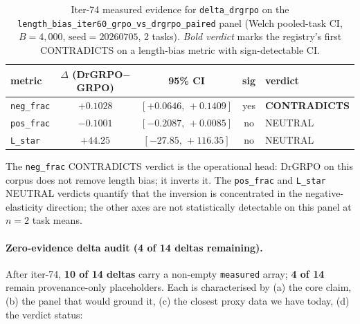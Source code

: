 \documentclass{article}
\begin{document}
\begin{table}[h]
\centering\scriptsize
\caption{Iter-74 measured evidence for \texttt{delta\_drgrpo} on the
\texttt{length\_bias\_iter60\_grpo\_vs\_drgrpo\_paired} panel
(Welch pooled-task CI, $B=4{,}000$, $\text{seed}=20260705$, 2 tasks).
\emph{Bold verdict} marks the registry's first CONTRADICTS on a
length-bias metric with sign-detectable CI.}
\label{tab:p6-drgrpo-measured}
\begin{tabular}{l c c c l}
\toprule
metric & $\Delta$ (DrGRPO$-$GRPO) & 95\% CI & sig & verdict \\
\midrule
\texttt{neg\_frac}  & $+0.1028$ & $[+0.0646,\,+0.1409]$ & yes & \textbf{CONTRADICTS} \\
\texttt{pos\_frac}  & $-0.1001$ & $[-0.2087,\,+0.0085]$ & no  & NEUTRAL \\
\texttt{L\_star}    & $+44.25$  & $[-27.85,\,+116.35]$  & no  & NEUTRAL \\
\bottomrule
\end{tabular}
\end{table}

The \texttt{neg\_frac} CONTRADICTS verdict is the operational head:
DrGRPO on this corpus does not remove length bias; it inverts it.
The \texttt{pos\_frac} and \texttt{L\_star} NEUTRAL verdicts
quantify that the inversion is concentrated in the
negative-elasticity direction; the other axes are not statistically
detectable on this panel at $n{=}2$ task means.

\paragraph{Zero-evidence delta audit (4 of 14 deltas remaining).}
After iter-74, \textbf{10 of 14 deltas} carry a non-empty
\texttt{measured} array; \textbf{4 of 14} remain provenance-only
placeholders. Each is characterised by (a) the core claim, (b) the
panel that would ground it, (c) the closest proxy data we have today,
(d) the verdict status:
\end{document}

